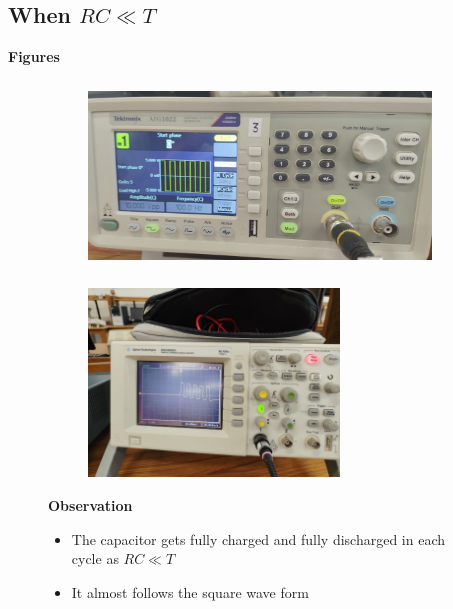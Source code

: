 \documentclass[a4paper,12pt]{article}
\begin{document}
\subsection{When $RC\ll T$}
\begin{itemize}
    \item \textbf{Figures}
    \begin{figure}[H]
    \centering
    \begin{subfigure}{0.48\textwidth}
        \centering
        \includegraphics[height=5cm]{figs/transinputrc<<t.jpeg}
    \end{subfigure}
    \hspace{0.04\textwidth} %
    \begin{subfigure}{0.48\textwidth}
        \centering
        \includegraphics[height=5cm]{figs/transoutputrc<<t.jpeg}
    \end{subfigure}
    \item \textbf{Observation}
    \begin{itemize}
        \item The capacitor gets fully charged and fully discharged in each cycle as $RC\ll T$
        \item It almost follows the square wave form
    \end{itemize}
\end{figure}
\end{itemize}
\newpage
\end{document}
